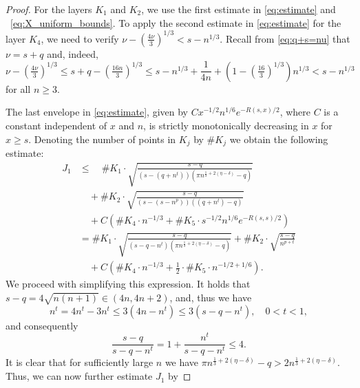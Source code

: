 \documentclass[10pt,a4paper]{amsart}
\begin{document}
\begin{proof}
    For the layers $K_1$ and $K_2$, we use the first estimate in \eqref{eq:estimate} and ~\eqref{eq:X_uniform_bounds}.
    To apply the second estimate in \eqref{eq:estimate} for the layer $K_4$, we need to verify $\nu-(\tfrac{4\nu}{3})^{1/3}<s-n^{1/3}$. Recall from \eqref{eq:q+s=nu} that $\nu =s+q$ and, indeed,
      \begin{equation}
          \nu-(\tfrac{4\nu}{3})^{1/3} \leq s+q-(\tfrac{16n}{3})^{1/3} \leq s - n^{1/3} + \frac{1}{4n} +(1-(\tfrac{16}{3})^{1/3})n^{1/3}
          <s-n^{1/3}
        \end{equation}
    for all $n\geq 3$.
    
    The last envelope in \eqref{eq:estimate}, given by $C x^{-1/2} n^{1/6} e^{-R(s,x)/2}$, where $C$ is a constant independent of $x$ and $n$, is strictly monotonically decreasing in $x$ for $x \geq s$.
    Denoting the number of points in $K_j$ by $\# K_j$ we obtain the following estimate:
    \begin{equation}\label{eq:sum_K123}
        \begin{split}
            J_1
            & \leq \quad \#K_1\cdot \sqrt{\frac{s-q}{(s-(q+n^{t}))(\pi n^{\frac{1}{3}+2(\eta -\delta)}-q)}} \\
            & \quad + \#K_2 \cdot \sqrt{\frac{s-q}{(s-(s-n^{p}))((q+n^{t})-q)}}\\
            & \quad +C \left(\#K_4\cdot n^{-1/3} +\# K_5  \cdot s^{-1/2} n^{1/6} e^{-R(s,s)/2}\right) \\
            &= \#K_1 \cdot \sqrt{\frac{s-q}{(s-q-n^{t})(\pi n^{\frac{1}{3}+2(\eta -\delta)}-q)}} 
             + \#K_2 \cdot \sqrt{\frac{s-q}{n^{p+t}}} \\
            & \quad + C \left(\#K_4\cdot n^{-1/3} + \tfrac{1}{2} \cdot \# K_5 \cdot n^{-1/2+1/6}\right).
        \end{split}
    \end{equation}
    We proceed with simplifying this expression. It holds that $s-q = 4\sqrt{n(n+1)}\in (4n,4n+2)$, and, thus we have
    \begin{equation}
        n^{t}= 4n^{t}-3n^{t} \leq 3(4n-n^{t})
        \leq 3(s-q-n^{t}), 
        \quad 0 < t < 1,
    \end{equation}
    and consequently
    \begin{equation}
        \frac{s-q}{s-q-n^t} = 1+\frac{n^t}{s-q-n^t}\leq 4.
    \end{equation}
    It is clear that for sufficiently large $n$ we have $\pi n^{\frac{1}{3}+2(\eta -\delta)}-q>2n^{\frac{1}{3}+2(\eta -\delta)}$. Thus, we can now further estimate $J_1$ by

\end{proof}
\end{document}
